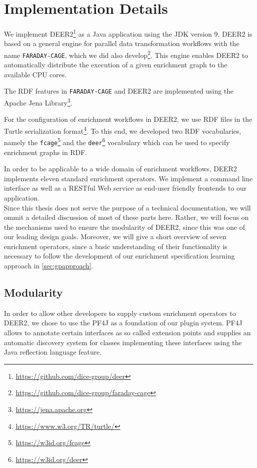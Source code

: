 \section{Implementation Details}
\label{sec:impl}

We implement \ac{DEER2}\footnote{\url{https://github.com/dice-group/deer}} as a Java application using the \ac{JDK} version 9.
\ac{DEER2} is based on a general engine for parallel data transformation workflows with the name \texttt{FARADAY-CAGE}, which we did also develop\footnote{\url{https://github.com/dice-group/faraday-cage}}.
This engine enables \ac{DEER2} to automatically distribute the execution of a given enrichment graph to the available CPU cores.

The \ac{RDF} features in \texttt{FARADAY-CAGE} and \ac{DEER2} are implemented using the Apache Jena Library\footnote{\url{https://jena.apache.org}}.

For the configuration of enrichment workflows in \ac{DEER2}, we use \ac{RDF} files in the Turtle serialization format\footnote{\url{https://www.w3.org/TR/turtle/}}.
To this end, we developed two RDF vocabularies, namely the \texttt{fcage}\footnote{\url{https://w3id.org/fcage}} and the \texttt{deer}\footnote{\url{https://w3id.org/deer}} vocabulary which can be used to specify enrichment graphs in \ac{RDF}.

In order to be applicable to a wide domain of enrichment workflows, \ac{DEER2} implements eleven standard enrichment operators.
We implement a command line interface as well as a RESTful Web service as end-user friendly frontends to our application.\\

Since this thesis does not serve the purpose of a technical documentation, we will ommit a detailed discussion of most of these parts here.
Rather, we will focus on the mechanisms used to ensure the modularity of \ac{DEER2}, since this was one of our leading design goals.
Moreover, we will give a short overview of seven enrichment operators, since a basic understanding of their functionality is necessary to follow the development of our enrichment specification learning approach in \autoref{sec:gpapproach}.

\subsection{Modularity}
\label{ssec:modularity}

In order to allow other developers to supply custom enrichment operators to \ac{DEER2}, we chose to use the \ac{PF4J} as a foundation of our plugin system.
\ac{PF4J} allows to annotate certain interfaces as so called extension points and supplies an automatic discovery system for classes implementing these interfaces using the Java reflection language feature.

